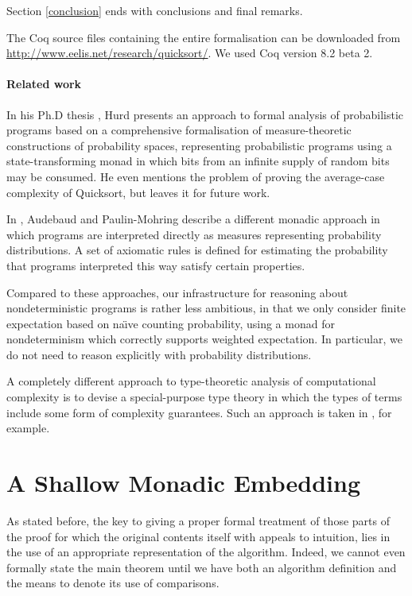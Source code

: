 \documentclass[runningheads]{llncs}
\begin{document}
Section \ref{conclusion} ends with conclusions and final remarks.

The Coq source files containing the entire formalisation can be downloaded from \url{http://www.eelis.net/research/quicksort/}. We used Coq version 8.2 beta 2.

\paragraph{Related work}

In his Ph.D thesis \cite{hurd}, Hurd presents an approach to formal analysis
of probabilistic programs based on a comprehensive formalisation of
measure-theoretic constructions of probability spaces, representing
probabilistic programs using a state-transforming monad in which bits from an
infinite supply of random bits may be consumed. He even mentions the problem
of proving the average-case complexity of Quicksort, but leaves it for future work.

In \cite{mohringaudebaud}, Audebaud and Paulin-Mohring describe a different monadic approach in which programs are interpreted directly as measures representing probability distributions. A set of axiomatic rules is defined for estimating the probability that programs interpreted this way satisfy certain properties.

Compared to these approaches, our infrastructure for reasoning about nondeterministic programs is rather less ambitious, in that we only consider finite expectation based on na{\"\i}ve counting probability, using a monad for nondeterminism which correctly supports weighted expectation. In particular, we do not need to reason explicitly with probability distributions.

A completely different approach to type-theoretic analysis of computational complexity is to devise a special-purpose type theory in which the types of terms include some form of complexity guarantees. Such an approach is taken in \cite{constable}, for example.

\section{A Shallow Monadic Embedding}
\label{embed}

As stated before, the key to giving a proper formal treatment of those parts of the proof for which the original contents itself with appeals to intuition, lies in the use of an appropriate representation of the algorithm. Indeed, we cannot even formally state the main theorem until we have both an algorithm definition and the means to denote its use of comparisons.
\end{document}
